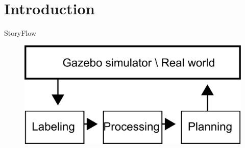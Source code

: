 \section{Introduction}

\begin{frame}{Story}{Flow}

\begin{figure}
\centering
\includegraphics[width = .7\textwidth]{./figure/flow.pdf}
\end{figure}

\end{frame}